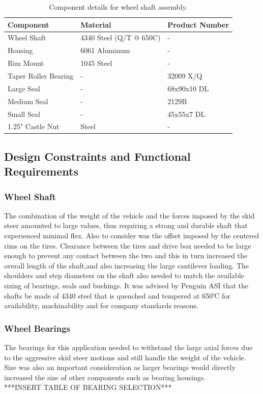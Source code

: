 \begin{table}[htbp]
	\centering
	\caption{Component details for wheel shaft assembly.}
	\begin{tabular}{| lll |} \hline
		Component & Material & Product Number \\ \hline
		Wheel Shaft & 4340 Steel (Q/T @ 650\degree C) & - \\
		Housing & 6061 Aluminum & - \\
		Rim Mount & 1045 Steel & - \\
		Taper Roller Bearing & - & 32009 X/Q \\
		Large Seal & - & 68x90x10 DL \\
		Medium Seal & - & 2129B \\
		Small Seal & - & 45x55x7 DL \\
		1.25" Castle Nut & Steel & - \\
	\end{tabular}
	\label{tab:design_spec}
\end{table}


\subsection{Design Constraints and Functional Requirements}
\subsubsection{Wheel Shaft}
The combination of the weight of the vehicle and the forces imposed by the skid steer amounted to large values, thus requiring a strong and durable shaft that experienced minimal flex. Also to consider was the offset imposed by the centered rims on the tires. Clearance between the tires and drive box needed to be large enough to prevent any contact between the two and this in turn increased the overall length of the shaft,and also increasing the large cantilever loading. The shoulders and step diameters on the shaft also needed to match the available sizing of bearings, seals and bushings. It was advised by Penguin ASI that the shafts be made of 4340 steel that is quenched and tempered at 650℃ for availability, machinability and for company standards reasons.

\subsubsection{Wheel Bearings}
The bearings for this application needed to withstand the large axial forces due to the aggressive skid steer motions and still handle the weight of the vehicle. Size was also an important consideration as larger bearings would directly increased the size of other components such as bearing housings.
\\
***INSERT TABLE OF BEARING SELECTION***
\\


